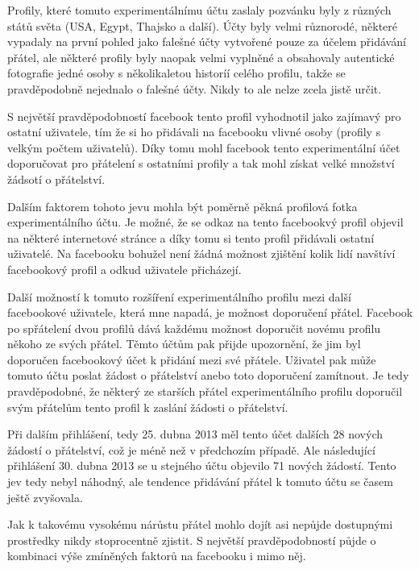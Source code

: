 \documentclass[thesis=M,czech]{FITthesis}[2013/05/10]
\begin{document}
Profily, které tomuto experimentálnímu účtu zaslaly pozvánku byly z různých států světa (USA, Egypt, Thajsko a další). Účty byly velmi různorodé, některé vypadaly na první pohled jako falešné účty vytvořené pouze za účelem přidávání přátel, ale některé profily byly naopak velmi vyplněné a obsahovaly autentické fotografie jedné osoby s několikaletou historíí celého profilu, takže se pravděpodobně nejednalo o falešné účty. Nikdy to ale nelze zcela jistě určit. 

S největší pravděpodobností facebook tento profil vyhodnotil jako zajímavý pro ostatní uživatele, tím že si ho přidávali na facebooku vlivné osoby (profily s velkým počtem uživatelů). Díky tomu mohl facebook tento experimentální účet doporučovat pro přátelení s ostatními profily a tak mohl získat velké množství žádsotí o přátelství.

Dalším faktorem tohoto jevu mohla být poměrně pěkná profilová fotka experimentálního účtu. Je možné, že se odkaz na tento facebookvý profil objevil na některé internetové stránce a díky tomu si tento profil přidávali ostatní uživatelé. Na facebooku bohužel není žádná možnost zjištění kolik lidí navštíví facebookový profil a odkud uživatele přicházejí.

Další možností k tomuto rozšíření experimentálního profilu mezi další facebookové uživatele, která mne napadá, je možnost doporučení přátel. Facebook po spřátelení dvou profilů dává každému možnost doporučit novému profilu někoho ze svých přátel. Těmto účtům pak přijde upozornění, že jim byl doporučen facebookový  účet k přidání mezi své přátele. Uživatel pak může tomuto účtu poslat žádost o přátelství anebo toto doporučení zamítnout. Je tedy pravděpodobné, že některý ze starších přátel experimentálního profilu doporučil svým přátelům tento profil k zaslání žádosti o přátelství. 

Při dalším přihlášení, tedy 25. dubna 2013 měl tento účet dalších 28 nových žádostí o přátelství, což je méně než v předchozím případě. Ale následující přihlášení 30. dubna 2013 se u stejného účtu objevilo 71 nových žádostí. Tento jev tedy nebyl náhodný, ale tendence přidávání přátel k tomuto účtu se časem ještě zvyšovala.

Jak k takovému vysokému nárůstu přátel mohlo dojít asi nepůjde dostupnými prostředky nikdy stoprocentně zjistit. S největší pravděpodobností půjde o kombinaci výše zmíněných faktorů na facebooku i mimo něj.

\end{document}
